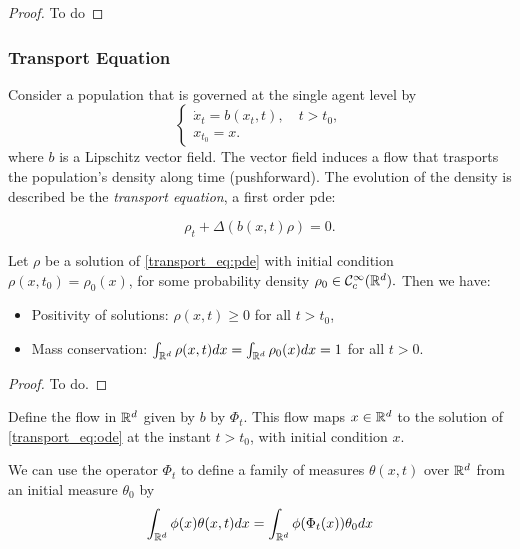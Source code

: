 \documentclass{article}
\begin{document}
\begin{proof}
    To do
\end{proof}


\subsubsection{Transport Equation}\label{transport_eq}
Consider a population that is governed at the single agent level by
\begin{equation}\label{transport_eq:ode}
\begin{cases}
    \dot x_t = b(x_t,t), \quad t > t_0,\\
    x_{t_0} = x.
\end{cases}
\end{equation}
where $b$ is a Lipschitz vector field. The vector field induces a flow that trasports the population's density along time (pushforward). The evolution of the density is described be the \textit{transport equation}, a first order pde:  

\begin{equation}\label{transport_eq:pde}
\rho_t + \Delta(b(x,t) \rho) = 0.
\end{equation}

\begin{proposition}    
Let $\rho$ be a solution of \eqref{transport_eq:pde} with initial condition $\rho(x,t_0) = \rho_0(x)$, for some probability density $\rho_0 \in \mathcal{C}_c^\infty (\mathbb{R}^d).$ Then we have:
\begin{itemize}
    \item Positivity of solutions: $\rho(x,t) \geq 0$ for all $t> t_0$,
    \item Mass conservation: $\int_{\mathbb{R}^d} \rho(x,t) dx = \int_{\mathbb{R}^d} \rho_0(x) dx = 1$ for all $t > 0$.
\end{itemize}
\end{proposition}

\begin{proof}
    To do.
\end{proof}

Define the flow in $\mathbb{R}^d$ given by $b$ by $\Phi_t$. This flow maps $x\in \mathbb{R}^d$ to the solution of \eqref{transport_eq:ode} at the instant $t > t_0$, with initial condition $x$.

We can use the operator $\Phi_t$ to define a family of measures $\theta(x,t)$ over $\mathbb{R}^d$ from an initial measure $\theta_0$ by 
\begin{equation}\label{transport_eq:family_of_measures}
\int_{\mathbb{R}^d} \phi(x) \theta(x,t) dx = \int_{\mathbb{R}^d} \phi(\Phi_t(x)) \theta_0 dx    
\end{equation}
\end{document}
